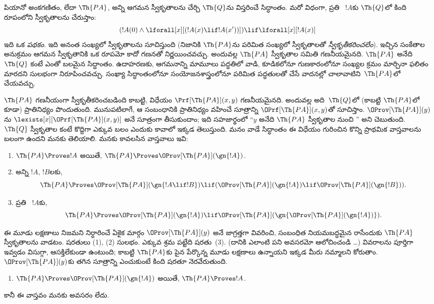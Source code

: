 \documentclass[../../../include/open-logic-section]{subfiles}
\begin{document}


పియానో అంకగణితం, లేదా $\Th{PA}$, అన్ని  ఆగమన స్వీకృతాలను
చేర్చి $\Th{Q}$ను విస్తరించే సిద్ధాంతం. మరో విధంగా, ప్రతి
~$!A$కు $\Th{Q}$లో కింది రూపంలోని స్వీకృతాలను చేరుస్తాం:
\[
(!A(0) \land \lforall[x][(!A(x) \lif !A(x'))]) \lif \lforall[x][!A(x)]
\]
ఇది ఒక \emph{పథకం}. ఇది అనంత సంఖ్యలో స్వీకృతాలను సూచిస్తుంది
(నిజానికి $\Th{PA}$ను పరిమిత సంఖ్యలో స్వీకృతాలతో \emph{స్వీకృతీకరించలేం}). ఇచ్చిన
సంకేతాల అనుక్రమం ఆగమన స్వీకృతానికి ఒక రూపమో కాదో గణనతో నిర్ణయించవచ్చు. అందువల్ల
$\Th{PA}$ స్వీకృతాల సమితి గణనీయమైనది. $\Th{PA}$ అనేది~$\Th{Q}$
కంటే ఎంతో బలమైన సిద్ధాంతం. ఉదాహరణకు, ఆగమనాన్ని మామూలు పద్ధతిలో
వాడి, కూడికలోనూ గుణకారంలోనూ సంఖ్యల క్రమం మార్చినా ఫలితం మారదని సులభంగా
నిరూపించవచ్చు. సంఖ్యా సిద్ధాంతంలోనూ సంయోజనశాస్త్రంలోనూ పరిమిత పద్ధతులతో
చేసే వాదనల్లో చాలావాటిని~$\Th{PA}$లో చేయవచ్చు.

$\Th{PA}$ గణనీయంగా స్వీకృతీకరించబడింది కాబట్టి, 
విధేయం $\Prf[\Th{PA}](x,y)$ గణనీయమైనది. అందువల్ల అది~$\Th{Q}$లో (కాబట్టి
$\Th{PA}$లో కూడా) ప్రాతినిధ్యం పొందుతుంది. మునుపటిలాగే, ఆ సంబంధానికి
ప్రాతినిధ్యం వహించే సూత్రాన్ని $\OPrf[\Th{PA}](x,y)$తో సూచిస్తాం.
$\OProv[\Th{PA}](y)$ను
$\lexists[x][\OPrf[\Th{PA}](x,y)]$ అనే సూత్రంగా తీసుకుందాం;
ఇది సహజార్థంలో ``$y$ అనేది $\Th{PA}$ స్వీకృతాల నుంచి
'' అని చెబుతుంది.
$\Th{Q}$ స్వీకృతాల కంటే కొద్దిగా ఎక్కువ బలం ఎందుకు కావాలో ఇక్కడ తెలుస్తుంది. మనం వాడే
సిద్ధాంతం ఈ  విధేయం గురించిన కొన్ని ప్రాథమిక వాస్తవాలను
 బలంగా ఉందని మనకు తెలియాలి. మనకు కావలసిన వాస్తవాలు ఇవి:
\begin{enumerate}
\item[P1.] $\Th{PA} \Proves !A$ అయితే, $\Th{PA} \Proves
  \OProv[\Th{PA}](\gn{!A})$.
\item[P2.] అన్ని  $!A$, $!B$లకు,
  \[
  \Th{PA} \Proves \OProv[\Th{PA}](\gn{!A \lif !B}) \lif
  (\OProv[\Th{PA}](\gn{!A}) \lif \OProv[\Th{PA}](\gn{!B})).
  \]
\item[P3.] ప్రతి ~$!A$కు,
  \[
  \Th{PA} \Proves \OProv[\Th{PA}](\gn{!A})
  \lif \OProv[\Th{PA}](\gn{\OProv[\Th{PA}](\gn{!A})}).
  \]
\end{enumerate}
ఈ మూడు లక్షణాలు నిజమని నిర్ధారించే ఏకైక మార్గం
$\OProv[\Th{PA}](y)$ అనే  జాగ్రత్తగా వివరించి, సంబంధిత నియమబద్ధమైన
 రాసేందుకు $\Th{PA}$ స్వీకృతాలను వాడటం. షరతులు (1), (2) సులభం.
ఎక్కువ శ్రమ పట్టేది షరతు~(3). (దానికి ఎలాంటి పని అవసరమో
ఆలోచించండి \dots) వివరాలను పూర్తిగా ఇవ్వడం విసుగ్గా, ఆసక్తిలేకుండా ఉంటుంది;
కాబట్టి $\Th{PA}$కు పైన పేర్కొన్న మూడు లక్షణాలు ఉన్నాయని ఇక్కడ మీరు
నమ్మాలని కోరుతాం. $\OProv[\Th{PA}](y)$కు తగిన సూత్రాన్ని ఎంచుకుంటే కింది షరతూ
నెరవేరుతుంది.
\begin{enumerate}
\item[P4.] $\Th{PA} \Proves \OProv[\Th{PA}](\gn{!A})$ అయితే,
  $\Th{PA} \Proves !A$.
\end{enumerate}
కానీ ఈ వాస్తవం మనకు అవసరం లేదు.
\end{document}
